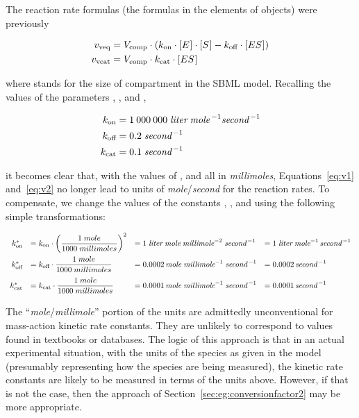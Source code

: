 The reaction rate formulas (\ie the formulas in the 
elements of \KineticLaw objects) were previously
\begin{linenomath}
  \begin{align}
    \label{eq:v1}
    v_\text{veq}  & = V_\text{comp} \cdot (k_\text{on} \cdot [E\mkern1mu] \cdot [S\mkern1mu] - k_\text{off} \cdot [ES\mkern1mu])\\
    \label{eq:v2}
    v_\text{vcat} & = V_\text{comp} \cdot k_\text{cat} \cdot [ES\mkern1mu]
  \end{align}
\end{linenomath}
where \Vcomp stands for the size of compartment  in the
SBML model.  Recalling the values of the parameters \kon, \koff,
and \kcat,
\begin{linenomath}
  \begin{align*}
    k_\text{on}         &= 1\:000\:000 \;\emph{liter} \;\emph{mole}^{\,-1} \emph{second}^{\,-1}\\
    k_\text{off}        &= 0.2 \;\emph{second}^{\,-1}\\
    k_\text{cat}        &= 0.1 \;\emph{second}^{\,-1}
  \end{align*}
\end{linenomath}
it becomes clear that, with the values of , 
and  all in \emph{millimoles}, Equations~\ref{eq:v1}
and~\ref{eq:v2} no longer lead to units of
\emph{mole}/\emph{second} for the reaction rates.  To compensate,
we change the values of the constants \kon, \koff, and \kcat using
the following simple transformations:
\begin{linenomath}
  \begin{equation*}
    \begin{array}{rlll}
      k_\text{on}^{*} &= k_\text{on} \cdot \left( \dfrac{1 \; mole}{1000 \; millimoles} \right)^{2}
      &= 1 \; \emph{liter} \; \emph{mole} \; \emph{millimole}^{-2} \; \emph{second}^{\,-1}
      &= 1 \; \emph{liter} \; \emph{mole}^{-1} \, \emph{second}^{\,-1}  \\[10pt]
      k_\text{off}^{*} &= k_\text{off} \cdot \dfrac{1 \; mole}{1000 \; millimoles}
      &= 0.0002 \, \emph{mole} \; \emph{millimole}^{-1} \; \emph{second}^{\,-1}
      &= 0.0002 \, \emph{second}^{\,-1} \\[10pt]
      k_\text{cat}^{*} &= k_\text{cat} \cdot \dfrac{1 \; mole}{1000 \; millimoles}
      &= 0.0001 \, \emph{mole} \; \emph{millimole}^{-1} \; \emph{second}^{\,-1}
      &= 0.0001 \, \emph{second}^{\,-1} \\[5pt]
    \end{array}
  \end{equation*}
\end{linenomath}
The ``\emph{mole}/\emph{millimole}'' portion of the units are
admittedly unconventional for mass-action kinetic rate constants.
They are unlikely to correspond to values found in textbooks or
databases.  The logic of this approach is that in an actual
experimental situation, with the units of the species as given in
the model (presumably representing how the species are being
measured), the kinetic rate constants are likely to be measured in
terms of the units above.  However, if that is not the case, then
the approach of Section~\ref{sec:eg:conversionfactor2} may be more
appropriate.

